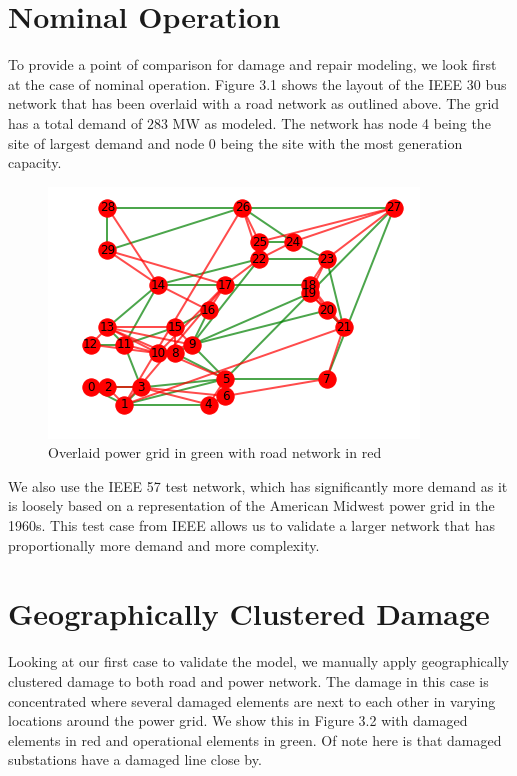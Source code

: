 \section{Nominal Operation}
To provide a point of comparison for damage and repair modeling, we look first at the case of nominal operation. Figure 3.1 shows the layout of the IEEE 30 bus network that has been overlaid with a road network as outlined above. The grid has a total demand of $283$ MW as modeled. The network has node 4 being the site of largest demand and node 0 being the site with the most generation capacity.
\begin{figure}[htbp]
	\centering
	
	\includegraphics[width=.9\linewidth]{GridLayout.png}
	\caption{Overlaid power grid in green with road network in red}
	\label{fig:sub1}

\end{figure}

We also use the IEEE 57 test network, which has significantly more demand as it is loosely based on a representation of the American Midwest power grid in the 1960s. This test case from IEEE allows us to validate a larger network that has proportionally more demand and more complexity. 

\section{Geographically Clustered Damage}
Looking at our first case to validate the model, we manually apply geographically clustered damage to both road and power network. The damage in this case is concentrated where several damaged elements are next to each other in varying locations around the power grid. We show this in Figure 3.2 with damaged elements in red and operational elements in green. Of note here is that damaged substations have a damaged line close by.


